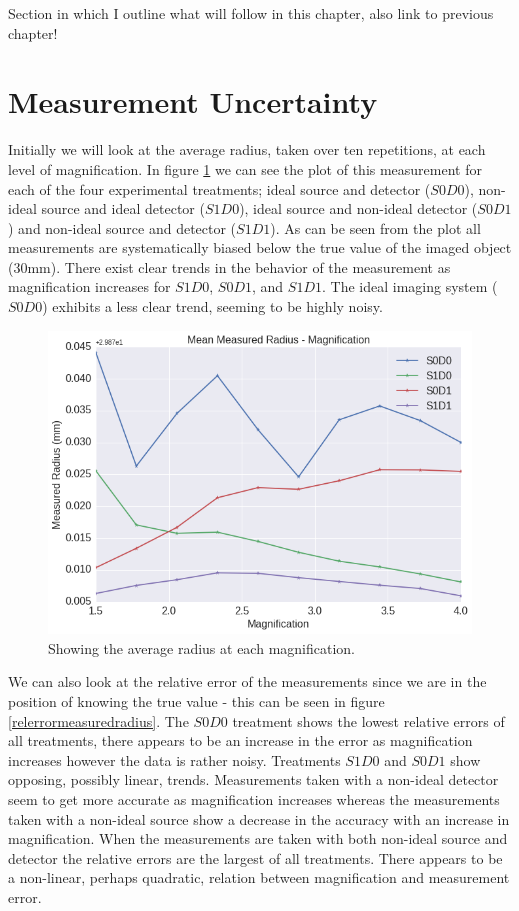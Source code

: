 \documentclass[
  twoside,
  11pt, a4paper,
  footinclude=true,
  headinclude=true,
  cleardoublepage=empty
]{scrbook}
\begin{document}
Section in which I outline what will follow in this chapter, also link to previous chapter!

\section{Measurement Uncertainty}

Initially we will look at the average radius, taken over ten repetitions, at each level of magnification. In figure \ref{avgmeasuredradius} we can see the plot of this measurement for each of the four experimental treatments; ideal source and detector ($S0D0$), non-ideal source and ideal detector ($S1D0$), ideal source and non-ideal detector ($S0D1$) and non-ideal source and detector ($S1D1$). As can be seen from the plot all measurements are systematically biased below the true value of the imaged object (30mm). There exist clear trends in the behavior of the measurement as magnification increases for $S1D0$, $S0D1$, and $S1D1$. The ideal imaging system ($S0D0$) exhibits a less clear trend, seeming to be highly noisy.

\begin{figure}[h!]
  \centering
    \includegraphics[width=\textwidth]{figures/output_10_0.png}
    \caption{Showing the average radius at each magnification.}
    \label{avgmeasuredradius}
\end{figure}

We can also look at the relative error of the measurements since we are in the position of knowing the true value - this can be seen in figure \ref{relerrormeasuredradius}. The $S0D0$ treatment shows the lowest relative errors of all treatments, there appears to be an increase in the error as magnification increases however the data is rather noisy. Treatments $S1D0$ and $S0D1$ show opposing, possibly linear, trends. Measurements taken with a non-ideal detector seem to get more accurate as magnification increases whereas the measurements taken with a non-ideal source show a decrease in the accuracy with an increase in magnification. When the measurements are taken with both non-ideal source and detector the relative errors are the largest of all treatments. There appears to be a non-linear, perhaps quadratic, relation between magnification and measurement error.
\end{document}
